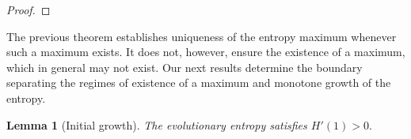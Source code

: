 \documentclass[10pt,a4paper]{amsart}
\newtheorem{lem}[thm]{Lemma}
\theoremstyle{definition}
\theoremstyle{remark}
\numberwithin{equation}{section}
\begin{document}
\begin{proof}
%
%
%
\end{proof}

The previous theorem establishes uniqueness of the entropy maximum whenever such a maximum exists. It does not,  however, ensure the existence of a maximum, which in general may not exist. Our next results determine the boundary separating the regimes of existence of a maximum and 
monotone growth of the entropy.

\begin{lem}[Initial growth]
The evolutionary entropy satisfies $H'(1)>0.$
\label{eq:typeII_initial_growth}
\end{lem}
\end{document}
